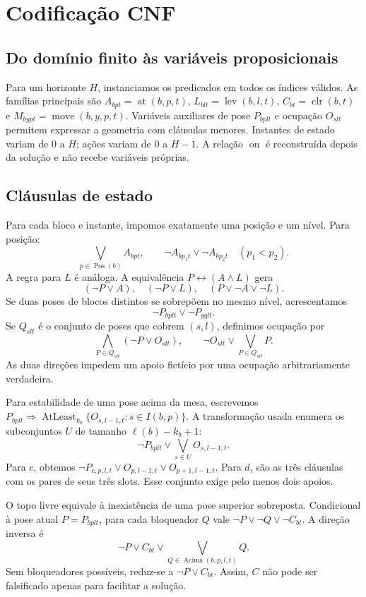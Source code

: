 \documentclass[11pt,a4paper]{article}
\newcommand{\at}{\operatorname{at}}
\newcommand{\lev}{\operatorname{lev}}
\newcommand{\clr}{\operatorname{clr}}
\newcommand{\On}{\operatorname{on}}
\newcommand{\mv}{\operatorname{move}}
\begin{document}
\section{Codificação CNF}
\subsection{Do domínio finito às variáveis proposicionais}
Para um horizonte $H$, instanciamos os predicados em todos os índices válidos. As famílias principais são $A_{bpt}=\at(b,p,t)$, $L_{blt}=\lev(b,l,t)$, $C_{bt}=\clr(b,t)$ e $M_{bypt}=\mv(b,y,p,t)$. Variáveis auxiliares de pose $P_{bplt}$ e ocupação $O_{slt}$ permitem expressar a geometria com cláusulas menores. Instantes de estado variam de 0 a $H$; ações variam de 0 a $H-1$. A relação $\On$ é reconstruída depois da solução e não recebe variáveis próprias.

\subsection{Cláusulas de estado}
Para cada bloco e instante, impomos exatamente uma posição e um nível. Para posição:
\[
\bigvee_{p\in\operatorname{Pos}(b)}A_{bpt},\qquad
\neg A_{bp_1t}\lor\neg A_{bp_2t}\quad(p_1<p_2).
\]
A regra para $L$ é análoga. A equivalência $P\leftrightarrow(A\land L)$ gera
\[
(\neg P\lor A),\quad(\neg P\lor L),\quad(P\lor\neg A\lor\neg L).
\]
Se duas poses de blocos distintos se sobrepõem no mesmo nível, acrescentamos
\[
\neg P_{bplt}\lor\neg P_{yqlt}.
\]
Se $Q_{slt}$ é o conjunto de poses que cobrem $(s,l)$, definimos ocupação por
\[
\bigwedge_{P\in Q_{slt}}(\neg P\lor O_{slt}),\qquad
\neg O_{slt}\lor\bigvee_{P\in Q_{slt}}P.
\]
As duas direções impedem um apoio fictício por uma ocupação arbitrariamente verdadeira.

Para estabilidade de uma pose acima da mesa, escrevemos $P_{bplt}\Rightarrow\operatorname{AtLeast}_{k_b}\{O_{s,l-1,t}:s\in I(b,p)\}$. A transformação usada enumera os subconjuntos $U$ de tamanho $\ell(b)-k_b+1$:
\[
\neg P_{bplt}\lor\bigvee_{s\in U}O_{s,l-1,t}.
\]
Para $c$, obtemos $\neg P_{c,p,l,t}\lor O_{p,l-1,t}\lor O_{p+1,l-1,t}$. Para $d$, são as três cláusulas com os pares de seus três slots. Esse conjunto exige pelo menos dois apoios.

O topo livre equivale à inexistência de uma pose superior sobreposta. Condicional à pose atual $P=P_{bplt}$, para cada bloqueador $Q$ vale $\neg P\lor\neg Q\lor\neg C_{bt}$. A direção inversa é
\[
\neg P\lor C_{bt}\lor\bigvee_{Q\in\operatorname{Acima}(b,p,l,t)}Q.
\]
Sem bloqueadores possíveis, reduz-se a $\neg P\lor C_{bt}$. Assim, $C$ não pode ser falsificado apenas para facilitar a solução.
\end{document}
